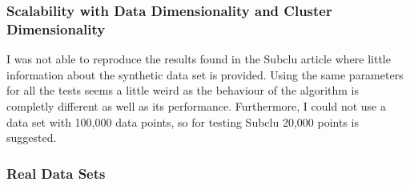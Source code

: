 \subsubsection{Scalability with Data Dimensionality and Cluster Dimensionality}
I was not able to reproduce the results found in the Subclu article where little information about the synthetic data set is provided. Using the same parameters for all the tests seems a little weird as the behaviour of the algorithm is completly different as well as its performance. Furthermore, I could not use a data set with 100,000 data points, so for testing Subclu 20,000 points is suggested.
\subsubsection{Real Data Sets}